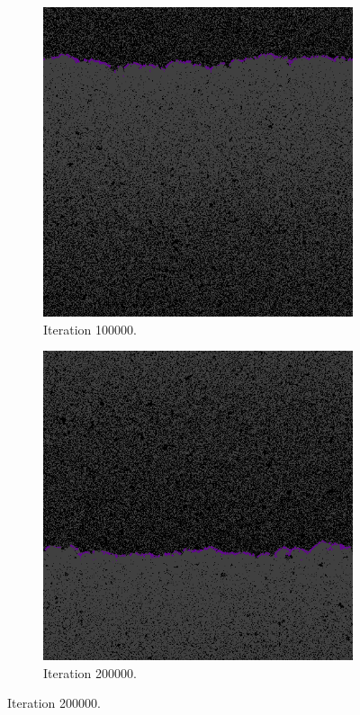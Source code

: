 \begin{figure}[H]
\begin{subfigure}{.25\textwidth}
  \centering
  \includegraphics[width=.9\linewidth]{img/sm100000}
  \caption{Iteration 100000.}
\end{subfigure}%
\begin{subfigure}{.25\textwidth}
  \centering
  \includegraphics[width=.9\linewidth]{img/sm200000}
  \caption{Iteration 200000.}
\end{subfigure}


\end{figure}
